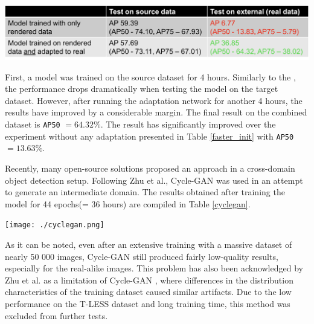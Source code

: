 \begin{table}[htb]
	\begin{center}
		\includegraphics[width=14cm]{./dadapt.png}
	\end{center}
	\begin{center}
		\label{dadapt}
	\end{center}
\end{table}
\FloatBarrier

First, a model was trained on the source dataset for 4 hours. Similarly to the , the performance drops dramatically when testing the model on the target dataset. However, after running the adaptation network for another 4 hours, the results have improved by a considerable margin. The final result on the combined dataset is \texttt{AP50} $= 64.32\%$. The result has significantly improved over the experiment without any adaptation presented in Table \ref{faster_init} with \texttt{AP50} $= 13.63\%$. 

Recently, many open-source solutions proposed \cite{Inoue_2018_CVPR, Chen2020, Arruda2019} an  approach in a cross-domain object detection setup. Following Zhu et al., Cycle-GAN \cite{Zhu2017} was used in an attempt to generate an intermediate domain. The results obtained after training the model for 44 epochs(= 36 hours) are compiled in Table \ref{cyclegan}.  

\begin{table}[htb]
	\begin{center}
		\texttt{[image: ./cyclegan.png]}
	\end{center}
	\begin{center}
		\label{cyclegan}
	\end{center}
\end{table}
\FloatBarrier

As it can be noted, even after an extensive training with a massive dataset of nearly 50 000 images, Cycle-GAN still produced fairly low-quality results, especially for the real-alike images. This problem has also been acknowledged by Zhu et al. as a limitation of Cycle-GAN \cite{Zhu2017}, where differences in the distribution characteristics of the training dataset caused similar artifacts. Due to the low performance on the T-LESS dataset and long training time, this method was excluded from further tests. 


